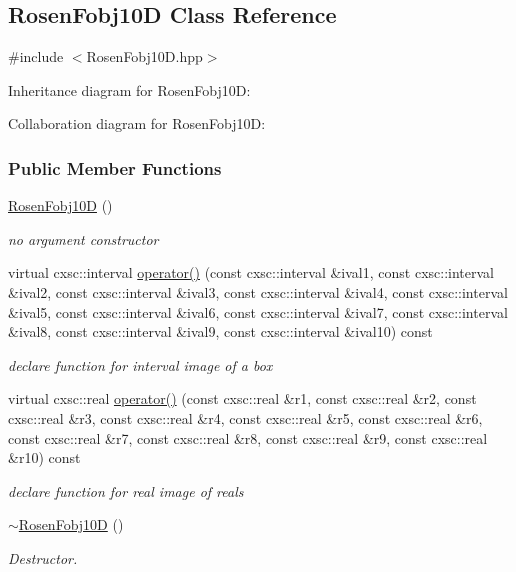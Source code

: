 \hypertarget{classRosenFobj10D}{\subsection{\-Rosen\-Fobj10\-D \-Class \-Reference}
\label{classRosenFobj10D}
}


{\ttfamily \#include $<$\-Rosen\-Fobj10\-D.\-hpp$>$}



\-Inheritance diagram for \-Rosen\-Fobj10\-D\-:


\-Collaboration diagram for \-Rosen\-Fobj10\-D\-:
\subsubsection*{\-Public \-Member \-Functions}
\begin{DoxyCompactItemize}
\item 
\hyperlink{classRosenFobj10D_a31f2f0188911fda75d236acc6066d953}{\-Rosen\-Fobj10\-D} ()
\begin{DoxyCompactList}\small\item\em no argument constructor \end{DoxyCompactList}\item 
virtual cxsc\-::interval \hyperlink{classRosenFobj10D_a011fef984ec3e8fb5341aac61f820a58}{operator()} (const cxsc\-::interval \&ival1, const cxsc\-::interval \&ival2, const cxsc\-::interval \&ival3, const cxsc\-::interval \&ival4, const cxsc\-::interval \&ival5, const cxsc\-::interval \&ival6, const cxsc\-::interval \&ival7, const cxsc\-::interval \&ival8, const cxsc\-::interval \&ival9, const cxsc\-::interval \&ival10) const 
\begin{DoxyCompactList}\small\item\em declare function for interval image of a box \end{DoxyCompactList}\item 
virtual cxsc\-::real \hyperlink{classRosenFobj10D_a29e49e4b03d8ce5a1f4729457e4df6c7}{operator()} (const cxsc\-::real \&r1, const cxsc\-::real \&r2, const cxsc\-::real \&r3, const cxsc\-::real \&r4, const cxsc\-::real \&r5, const cxsc\-::real \&r6, const cxsc\-::real \&r7, const cxsc\-::real \&r8, const cxsc\-::real \&r9, const cxsc\-::real \&r10) const 
\begin{DoxyCompactList}\small\item\em declare function for real image of reals \end{DoxyCompactList}\item 
\hyperlink{classRosenFobj10D_a0062dff32a46b61bdca81e2e5bc15321}{$\sim$\-Rosen\-Fobj10\-D} ()
\begin{DoxyCompactList}\small\item\em \-Destructor. \end{DoxyCompactList}\end{DoxyCompactItemize}


